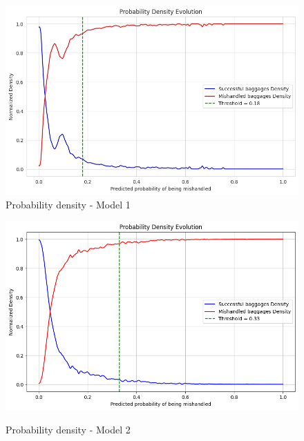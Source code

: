 \documentclass[12pt]{article}
\begin{document}
\FloatBarrier
\begin{figure}
\begin{minipage}[c]{0.5\linewidth}
    \includegraphics[width=1\textwidth]{Probability_density_Model 1.jpg}\\
    \caption{Probability density - Model 1}
\end{minipage}
\hfill
\begin{minipage}[c]{0.5\linewidth}
    \includegraphics[width=1\textwidth]{Probability_density_Model 2.png}\\
    \caption{Probability density - Model 2}
\end{minipage}%
\end{figure}
\end{document}
